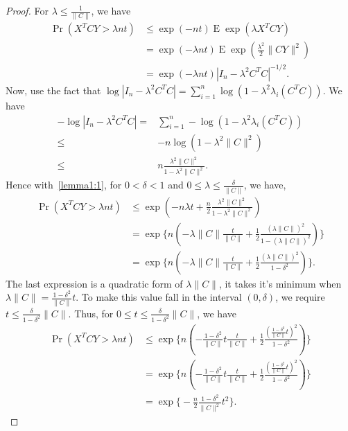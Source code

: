 \documentclass[11pt]{article}
\DeclareMathOperator{\myE}{E}
\theoremstyle{plain}
\theoremstyle{definition}
\theoremstyle{remark}
\begin{document}
\begin{proof}
    For $\lambda \leq \frac{1}{\|C\|}$, we have
    \begin{equation}\label{lemma1:1}
        \begin{aligned}
            \Pr(X^T C Y > \lambda nt)&\leq \exp(-nt)\myE \exp(\lambda X^T C Y)\\
            &= \exp(-\lambda nt)\myE \exp(\frac{\lambda^2}{2}\|CY\|^2)\\
            &= \exp(-\lambda nt)|I_n-\lambda^2 C^T C|^{-1/2}.
        \end{aligned}
    \end{equation}
Now, use the fact that $\log |I_n-\lambda^2 C^T C|=\sum_{i=1}^n \log(1-\lambda^2 \lambda_i(C^T C))$. We have
\begin{equation*}
    \begin{aligned}
-\log |I_n-\lambda^2 C^T C|
        =&\sum_{i=1}^n -\log(1-\lambda^2 \lambda_i(C^T C))\\
        \leq&  -n\log(1-\lambda^2 \|C\|^2)\\
        \leq & n \frac{\lambda^2\|C\|^2}{1-\lambda^2 \|C\|^2}.
    \end{aligned}
\end{equation*}
Hence with~\eqref{lemma1:1}, for $0<\delta<1$ and $0\leq \lambda\leq \frac{\delta}{\|C\|}$, we have,
    \begin{equation}\label{lemma1:2}
        \begin{aligned}
            \Pr(X^T C Y > \lambda nt)
            &\leq 
            \exp(-n\lambda t+\frac{n}{2}\frac{\lambda^2\|C\|^2}{1-\lambda^2 \|C\|^2})\\
            &= 
            \exp\Big\{n(-\lambda \|C\| \frac{t}{\|C\|}+\frac{1}{2}\frac{(\lambda\|C\|)^2}{1-(\lambda \|C\|)^2})\Big\}\\
            &= 
            \exp\Big\{n(-\lambda \|C\| \frac{t}{\|C\|}+\frac{1}{2}\frac{(\lambda\|C\|)^2}{1-\delta^2})\Big\}.
        \end{aligned}
    \end{equation}
The last expression is a quadratic form of $\lambda \|C\|$, it takes it's minimum when $\lambda \|C\|=\frac{1-\delta^2}{\|C\|}t$.
To make this value fall in the interval $(0,\delta)$, we require $t\leq \frac{\delta}{1-\delta^2}\|C\|$. Thus, for $0\leq t\leq\frac{\delta}{1-\delta^2}\|C\|$, we have
    \begin{equation*}
        \begin{aligned}
            \Pr(X^T C Y > \lambda nt)
            &\leq 
            \exp\Big\{n(-\frac{1-\delta^2}{\|C\|}t \frac{t}{\|C\|}+\frac{1}{2}\frac{(\frac{1-\delta^2}{\|C\|}t)^2}{1-\delta^2})\Big\}\\
            &=
            \exp\Big\{n(-\frac{1-\delta^2}{\|C\|}t \frac{t}{\|C\|}+\frac{1}{2}\frac{(\frac{1-\delta^2}{\|C\|}t)^2}{1-\delta^2})\Big\}\\
            &=
            \exp\Big\{-\frac{n}{2}\frac{1-\delta^2}{\|C\|^2}t^2\Big\}.
        \end{aligned}
    \end{equation*}
\end{proof}
\end{document}
